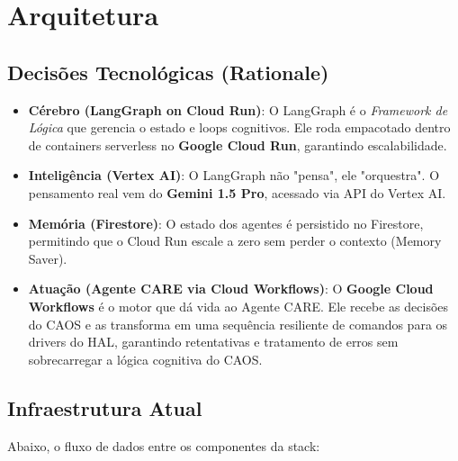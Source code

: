 \documentclass[12pt, a4paper]{article}
\begin{document}
\section{Arquitetura}
\label{sec:arquitetura_macro}



\subsection{Decisões Tecnológicas (Rationale)}
\begin{itemize}
    \item \textbf{Cérebro (LangGraph on Cloud Run)}: O LangGraph é o \textit{Framework de Lógica} que gerencia o estado e loops cognitivos. Ele roda empacotado dentro de containers serverless no \textbf{Google Cloud Run}, garantindo escalabilidade.
    \item \textbf{Inteligência (Vertex AI)}: O LangGraph não "pensa", ele "orquestra". O pensamento real vem do \textbf{Gemini 1.5 Pro}, acessado via API do Vertex AI.
    \item \textbf{Memória (Firestore)}: O estado dos agentes é persistido no Firestore, permitindo que o Cloud Run escale a zero sem perder o contexto (Memory Saver).
    \item \textbf{Atuação (Agente CARE via Cloud Workflows)}: O \textbf{Google Cloud Workflows} é o motor que dá vida ao Agente CARE. Ele recebe as decisões do CAOS e as transforma em uma sequência resiliente de comandos para os drivers do HAL, garantindo retentativas e tratamento de erros sem sobrecarregar a lógica cognitiva do CAOS.
\end{itemize}

\subsection{Infraestrutura Atual}
Abaixo, o fluxo de dados entre os componentes da stack:
\end{document}
